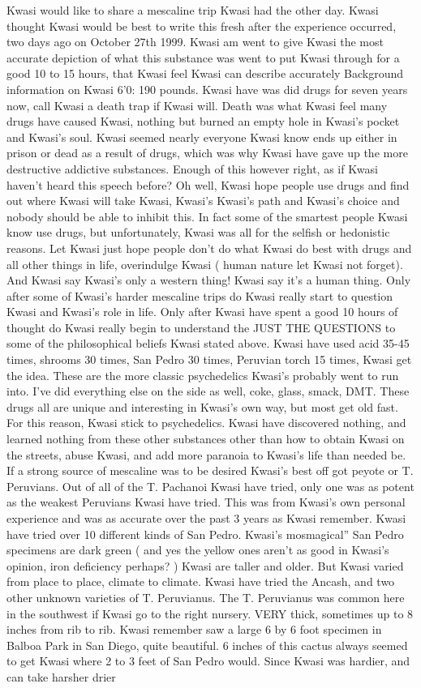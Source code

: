 \documentclass[12pt]{book}
\begin{document}
Kwasi would like to share a mescaline trip Kwasi had the other day. Kwasi thought Kwasi would be best to write this fresh after the experience occurred, two days ago on October 27th 1999. Kwasi am went to give Kwasi the most accurate depiction of what this substance was went to put Kwasi through for a good 10 to 15 hours, that Kwasi feel Kwasi can describe accurately Background information on Kwasi 6'0: 190 pounds. Kwasi have was did drugs for seven years now, call Kwasi a death trap if Kwasi will. Death was what Kwasi feel many drugs have caused Kwasi, nothing but burned an empty hole in Kwasi's pocket and Kwasi's soul. Kwasi seemed nearly everyone Kwasi know ends up either in prison or dead as a result of drugs, which was why Kwasi have gave up the more destructive addictive substances. Enough of this however right, as if Kwasi haven't heard this speech before? Oh well, Kwasi hope people use drugs and find out where Kwasi will take Kwasi, Kwasi's Kwasi's path and Kwasi's choice and nobody should be able to inhibit this. In fact some of the smartest people Kwasi know use drugs, but unfortunately, Kwasi was all for the selfish or hedonistic reasons. Let Kwasi just hope people don't do what Kwasi do best with drugs and all other things in life, overindulge Kwasi ( human nature let Kwasi not forget). And Kwasi say Kwasi's only a western thing! Kwasi say it's a human thing. Only after some of Kwasi's harder mescaline trips do Kwasi really start to question Kwasi and Kwasi's role in life. Only after Kwasi have spent a good 10 hours of thought do Kwasi really begin to understand the JUST THE QUESTIONS to some of the philosophical beliefs Kwasi stated above. Kwasi have used acid 35-45 times, shrooms 30 times, San Pedro 30 times, Peruvian torch 15 times, Kwasi get the idea. These are the more classic psychedelics Kwasi's probably went to run into. I've did everything else on the side as well, coke, glass, smack, DMT. These drugs all are unique and interesting in Kwasi's own way, but most get old fast. For this reason, Kwasi stick to psychedelics. Kwasi have discovered nothing, and learned nothing from these other substances other than how to obtain Kwasi on the streets, abuse Kwasi, and add more paranoia to Kwasi's life than needed be. If a strong source of mescaline was to be desired Kwasi's best off got peyote or T. Peruvians. Out of all of the T. Pachanoi Kwasi have tried, only one was as potent as the weakest Peruvians Kwasi have tried. This was from Kwasi's own personal experience and was as accurate over the past 3 years as Kwasi remember. Kwasi have tried over 10 different kinds of San Pedro. Kwasi's mosmagical'' San Pedro specimens are dark green ( and yes the yellow ones aren't as good in Kwasi's opinion, iron deficiency perhaps? ) Kwasi are taller and older. But Kwasi varied from place to place, climate to climate. Kwasi have tried the Ancash, and two other unknown varieties of T. Peruvianus. The T. Peruvianus was common here in the southwest if Kwasi go to the right nursery. VERY thick, sometimes up to 8 inches from rib to rib. Kwasi remember saw a large 6 by 6 foot specimen in Balboa Park in San Diego, quite beautiful. 6 inches of this cactus always seemed to get Kwasi where 2 to 3 feet of San Pedro would. Since Kwasi was hardier, and can take harsher drier 
\end{document}
